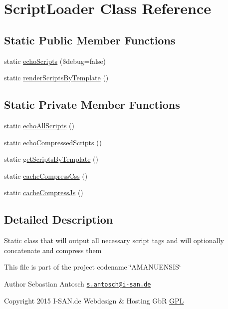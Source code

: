 \hypertarget{a00042}{}\section{Script\+Loader Class Reference}
\label{a00042}
\subsection*{Static Public Member Functions}
\begin{DoxyCompactItemize}
\item 
static \hyperlink{a00042_a3aed3a72d76aeefc626520b27462cfb4}{echo\+Scripts} (\$debug=false)
\item 
static \hyperlink{a00042_ae759fccd01c6627e968ca947f1d3a037}{render\+Scripts\+By\+Template} ()
\end{DoxyCompactItemize}
\subsection*{Static Private Member Functions}
\begin{DoxyCompactItemize}
\item 
static \hyperlink{a00042_afdb87513ad9f9ad117d8c06345e1a2c7}{echo\+All\+Scripts} ()
\item 
static \hyperlink{a00042_aa4d04b95f0b376d3be9e1605454b860d}{echo\+Compressed\+Scripts} ()
\item 
static \hyperlink{a00042_a667fa00ce97f004a58b32961fb4e3dc8}{get\+Scripts\+By\+Template} ()
\item 
static \hyperlink{a00042_ad73fc55052f4970fd58bcf3ab422b2b9}{cache\+Compress\+Css} ()
\item 
static \hyperlink{a00042_a3f95d89ee15eea49ebced0d77e3fd8c2}{cache\+Compress\+Js} ()
\end{DoxyCompactItemize}


\subsection{Detailed Description}
Static class that will output all necessary script tags and will optionally concatenate and compress them

This file is part of the project codename \char`\"{}\+A\+M\+A\+N\+U\+E\+N\+S\+I\+S\char`\"{}

\begin{DoxyAuthor}{Author}
Sebastian Antosch \href{mailto:s.antosch@i-san.de}{\tt s.\+antosch@i-\/san.\+de} 
\end{DoxyAuthor}
\begin{DoxyCopyright}{Copyright}
2015 I-\/\+S\+A\+N.\+de Webdesign \& Hosting Gb\+R \hyperlink{}{G\+P\+L }
\end{DoxyCopyright}


